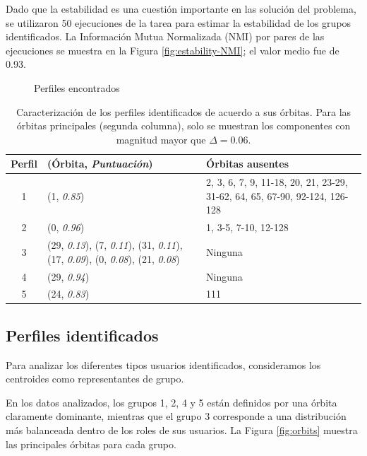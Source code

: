 Dado que la estabilidad es una cuestión importante en las solución del problema, se utilizaron 50 ejecuciones de la tarea para estimar la estabilidad de los grupos identificados. La Información Mutua Normalizada (NMI) por pares de las ejecuciones se muestra en la Figura \ref{fig:estability-NMI}; el valor medio fue de 0.93.

 \begin{figure}[htbp]
   \centering
   
    \caption{Perfiles encontrados}
    \label{fig:perfiles}
\end{figure}

\begin{table}[]    
    \centering
    \caption{Caracterización de los perfiles identificados de acuerdo a sus órbitas. Para las órbitas principales (segunda columna), solo se muestran los componentes con magnitud mayor que $\Delta=0.06$.}
    \begin{tabular}{cp{}p{}}\hline
         \textbf{Perfil}\phantom{xx} & \textbf{(Órbita, \textit{Puntuación})}&\textbf{Órbitas ausentes}\\\hline\hline
         1& (1, \textit{0.85}) & 2, 3, 6, 7, 9, 11-18, 20, 21, 23-29, 31-62, 64, 65, 67-90, 92-124, 126-128\\
         2&(0, \textit{0.96})&1, 3-5, 7-10, 12-128\\
         3&(29, \textit{0.13}), (7, \textit{0.11}), \newline(31, \textit{0.11}), (17, \textit{0.09}), \newline(0, \textit{0.08}), (21, \textit{0.08}) & Ninguna \\
         4& (29, \textit{0.94}) & Ninguna \\ 
         5&(24, \textit{0.83}) & 111 \\\hline
    \end{tabular}
    \label{table:orbitsgroups}
\end{table}

\subsection{Perfiles identificados}
Para analizar los diferentes tipos usuarios identificados, consideramos los centroides como representantes de grupo. 

En los datos analizados, los grupos 1, 2, 4 y 5 están definidos por una órbita claramente dominante, mientras que el grupo 3 corresponde a una distribución más balanceada dentro de los roles de sus usuarios. La Figura \ref{fig:orbits} muestra las principales órbitas para cada grupo. 

